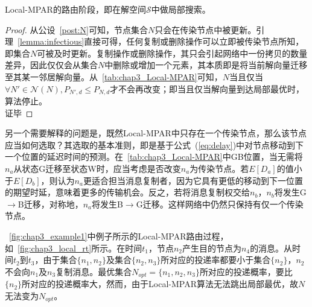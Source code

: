 \begin{theorem} 
Local-MPAR的路由阶段，即在解空间$\mathcal{S}$中做局部搜索。
\end{theorem}
\begin{proof}
从公设~\ref{post:N}可知，节点集合$N$只会在传染节点中被更新。引理~\ref{lemma:infectious}直接可得，任何复制或删除操作可以立即被传染节点所知，即集合$N$可被及时更新。复制操作或删除操作，其只会引起网络中一份拷贝的数量差异，因此仅仅会从集合$N$中删除或增加一个元素，其本质即是将当前解向量迁移至其某一邻居解向量。从\tablename~\ref{tab:chap3_Local-MPAR}可知，$N$当且仅当$\forall N'\in\mathcal{N}(N), P_{N',d}\leq P_{N,d}$才不会再改变；即当且仅当解向量到达局部最优时，算法停止。\\
证毕
\end{proof}

另一个需要解释的问题是，既然Local-MPAR中只存在一个传染节点，那么该节点应当如何选取？其选取的基本准则，即是基于公式~(\ref{eq:delay})中对节点移动到下一个位置的延迟时间的预测。在\tablename~\ref{tab:chap3_Local-MPAR}中GB位置，当无需将$n_a$从状态G迁移至状态W时，应当考虑是否改变$n_a$为传染节点。若$E[D_a]$的值小于$E[D_b]$，则认为$n_a$更适合担当消息复制者，因为它具有更低的移动到下一位置的期望时延，意味着更多的传输机会。反之，若将消息复制权交给$n_b$，$n_b$将发生G$\rightarrow$B迁移，对称地，$n_a$将发生B$\rightarrow$G迁移。这样网络中仍然只保持有仅一个传染节点。

\figurename~\ref{fig:chap3_example1}中例子所示的Local-MPAR路由过程，如\figurename~\ref{fig:chap3_local_rt}所示。在时间$t_1$，节点$n_2$产生目的节点为$n_4$的消息。从时间$t_2$到$t_3$，由于集合$\{n_1,n_2\}$及集合$\{n_2,n_3\}$所对应的投递率都要小于集合$\{n_2\}$，$n_2$不会向$n_1$及$n_3$复制消息。最优集合$N_{opt}=\{n_1,n_2,n_3\}$所对应的投递概率，要比$\{n_2\}$所对应的投递概率大，然而，由于Local-MPAR算法无法跳出局部最优，故$N$无法变为$N_{opt}$。

